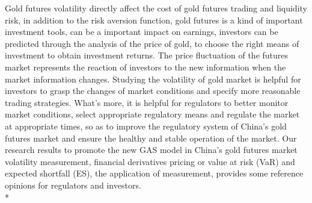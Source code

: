 \begin{eabstract}
Gold futures volatility directly affect the cost of gold futures trading and liquidity risk, in 
addition to the risk aversion function, gold futures is a kind of important investment tools, can 
be a important impact on earnings, investors can be predicted through the analysis of the price of 
gold, to choose the right means of investment to obtain investment returns. The price fluctuation 
of the futures market represents the reaction of investors to the new information when the market 
information changes. Studying the volatility of gold market is helpful for investors to grasp the 
changes of market conditions and specify more reasonable trading strategies. What's more, it is 
helpful for regulators to better monitor market conditions, select appropriate regulatory means and regulate the market at appropriate times, so as to improve the regulatory system of China's gold 
futures market and ensure the healthy and stable operation of the market. Our research results to 
promote the new GAS model in China's gold futures market volatility measurement, financial 
derivatives pricing or value at risk (VaR) and expected shortfall (ES), the application of 
measurement, provides some reference opinions for regulators and investors.
  \\*

\end{eabstract}

